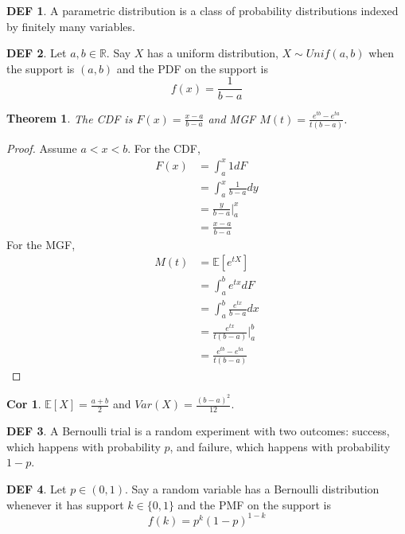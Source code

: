 \documentclass{article}
\newtheorem{theorem}{Theorem}
\theoremstyle{definition}\newtheorem{definition}{DEF}
\theoremstyle{definition}\newtheorem{example}{Ex}
\theoremstyle{lemma}\newtheorem{lemma}{Lemma}
\theoremstyle{corrolary}\newtheorem{corrolary}{Cor}
\begin{document}
\begin{definition}
A parametric distribution is a class of probability distributions indexed by finitely many variables.
\end{definition}

\begin{definition}
Let $a,b\in \mathbb{R}$.
Say $X$ has a uniform distribution, $X \sim Unif(a,b)$ when the support is $(a,b)$ and the PDF on the support is
\begin{equation}
f(x)=\frac{1}{b-a}
\end{equation}
\end{definition}

\begin{theorem}
The CDF is $F(x)=\frac{x-a}{b-a}$ and MGF $M(t)=\frac{e^{tb}-e^{ta}}{t(b-a)}$.
\end{theorem}
\begin{proof}
Assume $a<x<b$.
For the CDF,
\begin{align*}
F(x)&=\int_a^x 1dF\\
&=\int_a^x \frac{1}{b-a}dy\\
&=\frac{y}{b-a}|_a^x\\
&=\frac{x-a}{b-a}
\end{align*}
For the MGF,
\begin{align*}
M(t)&=\mathbb{E}[e^{tX}]\\
&= \int_a^b e^{tx}dF\\
&=\int_a^b \frac{e^{tx}}{b-a}dx\\
&=\frac{e^{tx}}{t(b-a)}|_a^b\\
&=\frac{e^{tb}-e^{ta}}{t(b-a)}
\end{align*}
\end{proof}
\begin{corrolary}
$\mathbb{E}[X]=\frac{a+b}{2}$ and $Var(X)=\frac{(b-a)^2}{12}$.
\end{corrolary}

\begin{definition}
A Bernoulli trial is a random experiment with two outcomes: success, which happens with probability $p$, and failure, which happens with probability $1-p$.
\end{definition}

\begin{definition}
Let $p\in (0,1)$.
Say a random variable has a Bernoulli distribution whenever it has support $k\in \{0,1\}$ and the PMF on the support is
\begin{equation}
f(k)=p^k(1-p)^{1-k}
\end{equation}
\end{definition}
\end{document}
